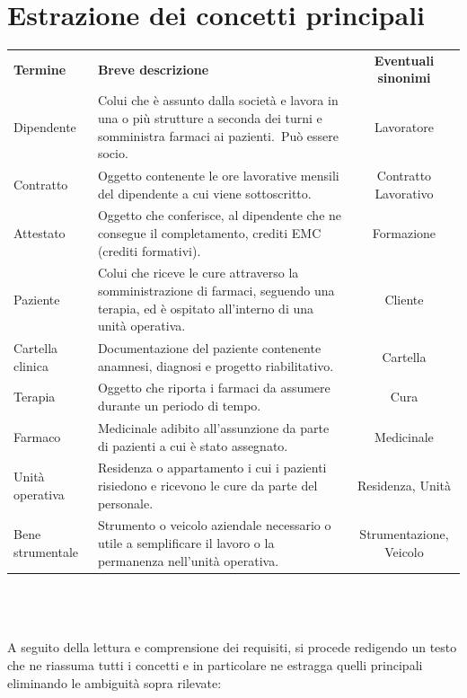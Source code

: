 \documentclass[a4paper, 12pt]{report}
\begin{document}
\section{Estrazione dei concetti principali}\label{sec:estrazione-dei-concetti-principali}
\begin{tabularx}{\textwidth}{lXc}
        \rowcolor{seaGreen}
        \textbf{Termine} & \textbf{Breve descrizione} & \textbf{Eventuali sinonimi} \\
        Dipendente & Colui che è assunto dalla società e lavora in una o più strutture a seconda dei turni e
        somministra farmaci ai pazienti.\ Può essere socio.\ & Lavoratore \\
        \hline
        Contratto & Oggetto contenente le ore lavorative mensili del dipendente a cui viene sottoscritto.\ & Contratto Lavorativo \\
        \hline
        Attestato & Oggetto che conferisce, al dipendente che ne consegue il completamento, crediti EMC (crediti formativi).\ & Formazione \\
        \hline
        Paziente & Colui che riceve le cure attraverso la somministrazione di farmaci, seguendo una terapia, ed è ospitato
        all'interno di una unità operativa.\ & Cliente \\
        \hline
        Cartella clinica & Documentazione del paziente contenente anamnesi, diagnosi e progetto riabilitativo.\ & Cartella \\
        \hline
        Terapia & Oggetto che riporta i farmaci da assumere durante un periodo di tempo.\ & Cura \\
        \hline
        Farmaco & Medicinale adibito all'assunzione da parte di pazienti a cui è stato assegnato.\ & Medicinale \\
        \hline
        Unità operativa & Residenza o appartamento i cui i pazienti risiedono e ricevono le cure da parte del personale.\ & Residenza, Unità \\
        \hline
        Bene strumentale & Strumento o veicolo aziendale necessario o utile a semplificare il lavoro o la permanenza nell'unità operativa.\ & Strumentazione, Veicolo
\end{tabularx}
\\\\\\
A seguito della lettura e comprensione dei requisiti, si procede redigendo un testo che ne 
riassuma tutti i concetti e in particolare ne estragga quelli principali eliminando le ambiguità 
sopra rilevate:
\end{document}
